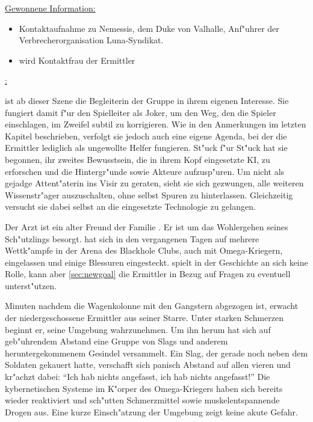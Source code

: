 \begin{remarks}
	\underline{Gewonnene Information:}
	
	\begin{itemize}
		\item Kontaktaufnahme zu Nemessis, dem Duke von Valhalle, Anf"uhrer der Verbrecherorganisation Luna-Syndikat.
		\item \xl{} wird Kontaktfrau der Ermittler
	\end{itemize}

	\underline{\xl{}:}

	\xl{} ist ab dieser Szene die Begleiterin der Gruppe in ihrem eigenen Interesse. Sie fungiert damit f"ur den Spielleiter als Joker, um den Weg, den die Spieler einschlagen, im Zweifel subtil zu korrigieren. Wie in den Anmerkungen im letzten Kapitel beschrieben, verfolgt sie jedoch auch eine eigene Agenda, bei der die Ermittler lediglich als ungewollte Helfer fungieren. St"uck f"ur St"uck hat sie begonnen, ihr zweites Bewusstsein, die in ihrem Kopf eingesetzte KI, zu erforschen und die Hintergr"unde sowie Akteure aufzusp"uren.  Um nicht als gejadge Attent"aterin ins Visir zu geraten, sieht sie sich gezwungen, alle weiteren Wissenstr"ager auszuschalten, ohne selbst Spuren zu hinterlassen. Gleichzeitig versucht sie dabei selbst an die eingesetzte Technologie zu gelangen.

	\underline{ }

	Der Arzt   ist ein alter Freund der Familie . Er ist um das Wohlergehen seines Sch"utzlings \xl{} besorgt. \xl{} hat sich in den vergangenen Tagen auf mehrere Wettk"ampfe in der Arena des Blackhole Clubs, auch mit Omega-Kriegern, eingelassen und einige Blessuren eingesteckt.   spielt in der Geschichte an sich keine Rolle, kann aber  \cref{sec:newgoal} die Ermittler in Bezug auf Fragen zu \xl{} eventuell unterst"utzen.
\end{remarks}



Minuten nachdem die Wagenkolonne mit den Gangstern abgezogen ist, erwacht der niedergeschossene Ermittler aus seiner Starre. Unter starken Schmerzen beginnt er, seine Umgebung wahrzunehmen. Um ihn herum hat sich auf geb"uhrendem Abstand eine Gruppe von Slags und anderem heruntergekommenem Gesindel versammelt. Ein Slag, der gerade noch neben dem Soldaten gekauert hatte, verschafft sich panisch Abstand auf allen vieren und kr"achzt dabei: "`Ich hab nichts angefasst, ich hab nichts angefasst!"' Die kybernetischen Systeme im K"orper des 
Omega-Kriegers haben sich bereits wieder reaktiviert und sch"utten Schmerzmittel sowie muskelentspannende Drogen aus. Eine kurze Einsch"atzung der Umgebung zeigt keine akute Gefahr.

